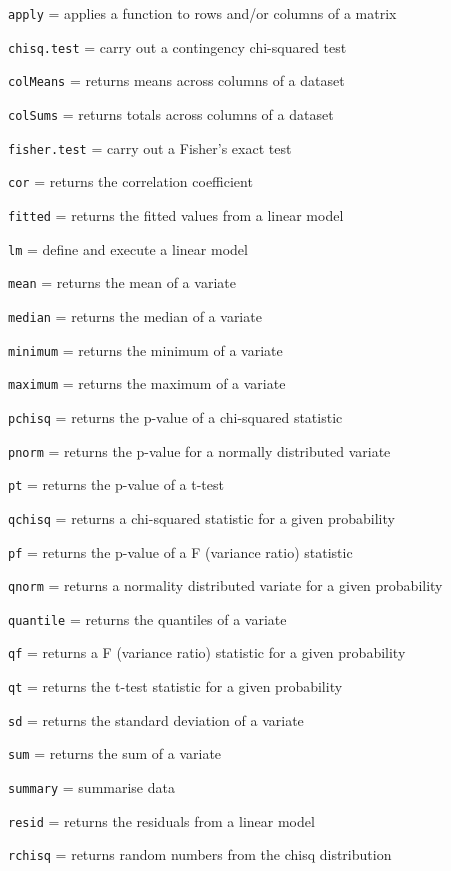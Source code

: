 \documentclass[
]{book}
\begin{document}
\texttt{apply} = applies a function to rows and/or columns of a matrix

\texttt{chisq.test} = carry out a contingency chi-squared test

\texttt{colMeans} = returns means across columns of a dataset

\texttt{colSums} = returns totals across columns of a dataset

\texttt{fisher.test} = carry out a Fisher's exact test

\texttt{cor} = returns the correlation coefficient

\texttt{fitted} = returns the fitted values from a linear model

\texttt{lm} = define and execute a linear model

\texttt{mean} = returns the mean of a variate

\texttt{median} = returns the median of a variate

\texttt{minimum} = returns the minimum of a variate

\texttt{maximum} = returns the maximum of a variate

\texttt{pchisq} = returns the p-value of a chi-squared statistic

\texttt{pnorm} = returns the p-value for a normally distributed variate

\texttt{pt} = returns the p-value of a t-test

\texttt{qchisq} = returns a chi-squared statistic for a given probability

\texttt{pf} = returns the p-value of a F (variance ratio) statistic

\texttt{qnorm} = returns a normality distributed variate for a given probability

\texttt{quantile} = returns the quantiles of a variate

\texttt{qf} = returns a F (variance ratio) statistic for a given probability

\texttt{qt} = returns the t-test statistic for a given probability

\texttt{sd} = returns the standard deviation of a variate

\texttt{sum} = returns the sum of a variate

\texttt{summary} = summarise data

\texttt{resid} = returns the residuals from a linear model

\texttt{rchisq} = returns random numbers from the chisq distribution
\end{document}
